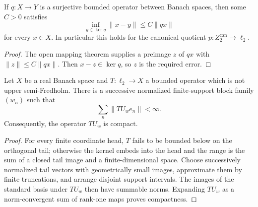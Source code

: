 \begin{lemma}
\label{lem:canonical-kernel-approximation}
If $q:X\to Y$ is a surjective bounded operator between Banach spaces, then some $C>0$ satisfies
\[
  \inf_{y\in\ker q}\lVert x-y\rVert\le C\lVert qx\rVert
\]
for every $x\in X$.  In particular this holds for the canonical quotient
$p:Z_2^{\mathrm{can}}\to\ell_2$.
\leanok
\end{lemma}

\begin{proof}
The open mapping theorem supplies a preimage $z$ of $qx$ with
$\lVert z\rVert\le C\lVert qx\rVert$.  Then $x-z\in\ker q$, so $z$ is the required error.
\end{proof}

\begin{lemma}\label{lem:compact-canonical-block-extraction}
Let $X$ be a real Banach space and $T:\ell_2\to X$ a bounded operator which is not upper
semi-Fredholm.  There is a successive normalized finite-support block family $(w_n)$ such that
\[
  \sum_n\lVert TU_we_n\rVert<\infty.
\]
Consequently, the operator $TU_w$ is compact.
\leanok
\end{lemma}

\begin{proof}
For every finite coordinate head, $T$ fails to be bounded below on the orthogonal tail;
otherwise the kernel embeds into the head and the range is the sum of a closed tail image and a
finite-dimensional space.  Choose successively normalized tail vectors with geometrically small
images, approximate them by finite truncations, and arrange disjoint support intervals.  The
images of the standard basis under $TU_w$ then have summable norms.  Expanding $TU_w$ as a
norm-convergent sum of rank-one maps proves compactness.
\end{proof}

